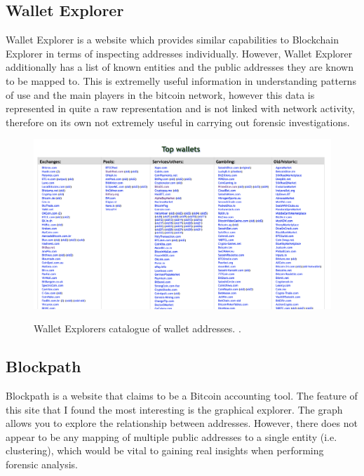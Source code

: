 \subsection{Wallet Explorer}
Wallet Explorer is a website which provides similar capabilities to Blockchain Explorer in terms of inspecting addresses individually. However, Wallet Explorer additionally has a list of known entities and the public addresses they are known to be mapped to. This is extremelly useful information in understanding patterns of use and the main players in the bitcoin network, however this data is represented in quite a raw representation and is not linked with network activity, therefore on its own not extremely useful in carrying out forensic investigations.

\begin{figure}[h!]
  \centering
  \includegraphics[width = 15cm]{./figures/walletexplorer}\\[0.5cm] 
  \caption{Wallet Explorers catalogue of wallet addresses. \cite{RefWorks:doc:5c4b26f3e4b0ea619646d513}.}
\end{figure}

\subsection{Blockpath} 
Blockpath is a website that claims to be a Bitcoin accounting tool. The feature of this site that I found the most interesting is the graphical explorer. The graph allows you to explore the relationship between addresses. However, there does not appear to be any mapping of multiple public addresses to a single entity (i.e. clustering), which would be vital to gaining real insights when performing forensic analysis.  

